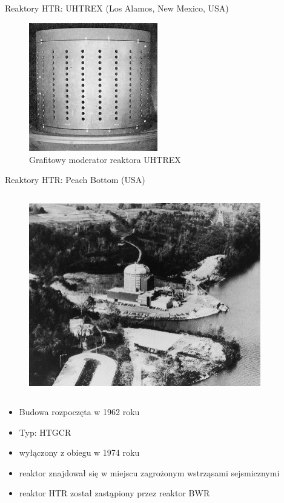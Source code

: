 \begin{frame}{Reaktory HTR: UHTREX (Los Alamos, New Mexico, USA)}
    \begin{figure}
        \centering
        \includegraphics[width=0.5\textwidth, frame]{images/UHTREX_Moderator_graphite.jpg}
        \caption{Grafitowy moderator reaktora UHTREX}
    \end{figure}
\end{frame}



\begin{columnframe}{Reaktory HTR: Peach Bottom (USA)}
    \begin{column}{0.5\textwidth}
        \begin{figure}
            \centering
            \includegraphics[width=0.9\textwidth, frame]{images/peach_bottom_aerial_view.jpg}
        \end{figure}
    \end{column}
    \begin{column}{0.5\textwidth}
        \begin{itemize}
            \item Budowa rozpoczęta w 1962 roku
            \item Typ: HTGCR
            \item wyłączony z obiegu w 1974 roku
            \item reaktor znajdował się w miejscu zagrożonym wstrząsami sejsmicznymi
            \item reaktor HTR został zastąpiony przez reaktor BWR
        \end{itemize}
    \end{column}
\end{columnframe}


